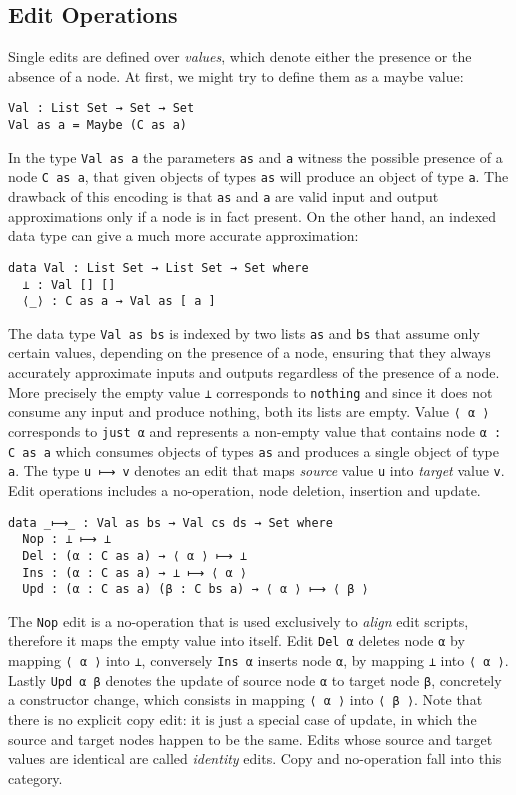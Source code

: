\documentclass{sigplanconf}
\theoremstyle{plain}
\begin{document}
	\subsection{Edit Operations}
	Single edits are defined over \emph{values}, which denote either the presence or 
	the absence of a node.
        At first, we might try to define them as a maybe value:
\begin{verbatim}
Val : List Set → Set → Set
Val as a = Maybe (C as a)
\end{verbatim}
        In the type \texttt{Val as a} the parameters \texttt{as} and
        \texttt{a} witness the possible presence of a node \texttt{C
          as a}, that given objects of types \texttt{as} will produce
        an object of type \texttt{a}.
        The drawback of this encoding is that \texttt{as} and
        \texttt{a} are valid input and output approximations only if a
        node is in fact present.
        On the other hand, an indexed data type can give a much more
        accurate approximation:
\begin{verbatim}
data Val : List Set → List Set → Set where
  ⊥ : Val [] []
  ⟨_⟩ : C as a → Val as [ a ] 
\end{verbatim}
  The data type \texttt{Val as bs} is indexed by two lists
  \texttt{as} and \texttt{bs} that assume only certain values,
  depending on the presence of a node, ensuring that they always
  accurately approximate inputs and outputs regardless of the
  presence of a node.
%
  More precisely the empty value \texttt{⊥} corresponds to
  \texttt{nothing} and since it does not consume any input and produce
  nothing, both its lists are empty.
%
  Value \texttt{⟨ α ⟩} corresponds to \texttt{just α} and represents a
  non-empty value that contains node \texttt{α : C as a} which
  consumes objects of types \texttt{as} and produces a single object
  of type \texttt{a}.
%
  The type \texttt{u ⟼ v} denotes an edit that maps \emph{source}
  value \texttt{u} into \emph{target} value \texttt{v}.
%
  Edit operations includes a no-operation, node deletion, insertion
  and update.
\begin{verbatim}
data _⟼_ : Val as bs → Val cs ds → Set where
  Nop : ⊥ ⟼ ⊥
  Del : (α : C as a) → ⟨ α ⟩ ⟼ ⊥
  Ins : (α : C as a) → ⊥ ⟼ ⟨ α ⟩
  Upd : (α : C as a) (β : C bs a) → ⟨ α ⟩ ⟼ ⟨ β ⟩
\end{verbatim}
  The \texttt{Nop} edit is a no-operation that is used exclusively to
  \emph{align} edit scripts, therefore it maps the empty value into
  itself.  
%
  Edit \texttt{Del α} deletes node \texttt{α} by mapping \texttt{⟨ α
    ⟩} into \texttt{⊥}, conversely \texttt{Ins α} inserts node
  \texttt{α}, by mapping \texttt{⊥} into \texttt{⟨ α ⟩}.
%
  Lastly \texttt{Upd α β} denotes the update of source node \texttt{α}
  to target node \texttt{β}, concretely a constructor change, which consists in mapping \texttt{⟨ α ⟩}
  into \texttt{⟨ β ⟩}.
%
  Note that there is no explicit copy edit: it is just a special case
  of update, in which the source and target nodes happen to be the
  same. 
%
  Edits whose source and target values are identical are called
  \emph{identity} edits. Copy and no-operation fall into this
  category.
	
\end{document}

